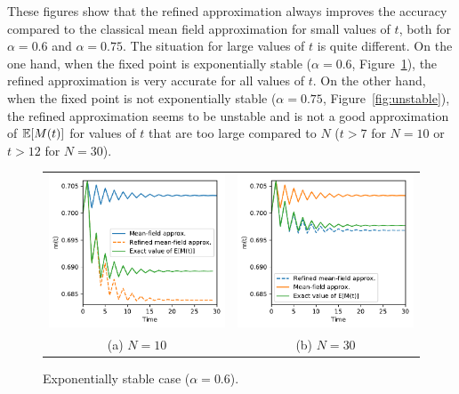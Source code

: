 \documentclass{sig-alternate-per}
\newcommand\esp[1]{{\mathchoice{\besp{#1}}{\sesp{#1}}{\sesp{#1}}{\sesp{#1}}}}
\newcommand\besp[1]{\mathbb{E}\left[#1\right]}
\newcommand\sesp[1]{\mathbb{E}[#1]}
\begin{document}
These figures show that the refined approximation always improves the
accuracy compared to the classical mean field approximation for small
values of $t$, both for $\alpha=0.6$ and $\alpha=0.75$. The situation
for large values of $t$ is quite different. On the one hand, when the
fixed point is exponentially stable ($\alpha=0.6$,
Figure~\ref{fig:stable}), the refined approximation is very accurate
for all values of $t$. On the other hand, when the fixed point is not
exponentially stable ($\alpha=0.75$, Figure~\ref{fig:unstable}), the
refined approximation seems to be unstable and is not a good
approximation of $\esp{M(t)}$ for values of $t$ that are too large
compared to $N$ ($t>7$ for $N=10$ or $t>12$ for $N=30$).

\begin{figure}[ht]
  \centering
  \begin{tabular}{@{}c@{}c@{}}
    \includegraphics[width=.5\linewidth]{unstable1D_a60_N10}
    &\includegraphics[width=.5\linewidth]{unstable1D_a60_N30}\\
    (a) $N=10$ & (b) $N=30$
  \end{tabular}
  \caption{Exponentially stable case ($\alpha=0.6$).}
  \label{fig:stable}
\end{figure}
\end{document}
